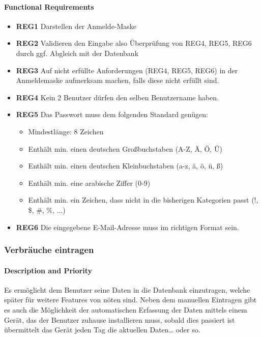 \paragraph{Functional Requirements}
\begin{itemize}
	\item \textbf{REG1} Darstellen der Anmelde-Maske
	\item \textbf{REG2} Validieren den Eingabe also Überprüfung von REG4, REG5, REG6  durch ggf. Abgleich mit der Datenbank
	\item \textbf{REG3} Auf nicht erfüllte Anforderungen (REG4, REG5, REG6) in der Anmeldemaske aufmerksam machen, falls diese nicht erfüllt sind.
	\item \textbf{REG4} Kein 2 Benutzer dürfen den selben Benutzername haben.
	\item \textbf{REG5} Das Passwort muss dem folgenden Standard genügen:
	\begin{itemize}
		\item Mindestlänge: 8 Zeichen
		\item Enthält min. einen deutschen Großbuchstaben (A-Z, Ä, Ö, Ü)
		\item Enthält min. einen deutschen Kleinbuchstaben (a-z, ä, ö, ü, ß)
		\item Enthält min. eine arabische Ziffer (0-9)
		\item Enthält min. ein Zeichen, dass nicht in die bisherigen Kategorien passt (!, \$, \#, \%, ...)
	\end{itemize}
	\item \textbf{REG6} Die eingegebene E-Mail-Adresse muss im richtigen Format sein.
	
\end{itemize}

\subsubsection{Verbräuche eintragen}
\paragraph{Description and Priority}
Es ermöglicht dem Benutzer seine Daten in die Datenbank einzutragen, welche später für weitere Features von nöten sind. Neben dem manuellen Eintragen gibt es auch die Möglichkeit der automatischen Erfassung der Daten mittels einem Gerät, das der Benutzer zuhause installieren muss, sobald dies passiert ist übermittelt das Gerät jeden Tag die aktuellen Daten… oder so.

